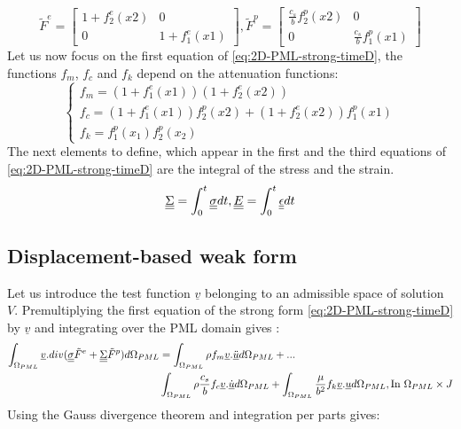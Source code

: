 \begin{equation}
\tilde{F}^e = \begin{bmatrix}
1+f^e_2(x2)&0\\0&1+f^e_1(x1)
\end{bmatrix}, \tilde{F}^p = \begin{bmatrix}
\frac{c_s}{b}f^p_2(x2)&0\\0&\frac{c_s}{b}f^p_1(x1) 
\end{bmatrix} 
\end{equation}
Let us now focus on the first equation of \ref{eq:2D-PML-strong-timeD}, the functions $f_m$, $f_c$ and $f_k$ depend on the attenuation functions:
\begin{equation}
\begin{cases}
f_m = (1+f^e_1(x1))(1+f^e_2(x2))\\
f_c = (1+f^e_1(x1))f^p_2(x2) + (1+f^e_2(x2))f^p_1(x1)\\
f_k = f^p_1(x_1)f^p_2(x_2)
\end{cases}
\end{equation}
The next elements to define, which appear in the first and the third equations of \ref{eq:2D-PML-strong-timeD} are the integral of the stress and the strain.
\begin{equation}
\underline{\underline{\Sigma}} = \int^t_0 \underline{\underline{\sigma}} dt, \underline{\underline{E}} = \int^t_0 \underline{\underline{\epsilon}} dt
\end{equation} 
\subsection{Displacement-based weak form}
Let us introduce the test function $\underline{v}$ belonging to an admissible space of solution $V$. Premultiplying the first equation of the strong form \ref{eq:2D-PML-strong-timeD} by $\underline{v}$ and integrating over the PML domain gives :
\begin{align}
\int_{\Omega_{PML}} \underline{v}.div(\underline{\underline{\sigma}}\tilde{F}^e + \underline{\underline{\Sigma}}\tilde{F}^p) d\Omega_{PML} & = \int_{\Omega_{PML}} \rho f_m \underline{v}.\underline{\ddot{u}} d\Omega_{PML} + ... \nonumber\\
&  \int_{\Omega_{PML}} \rho \frac{c_s}{b} f_c \underline{v}.\underline{\dot{u}} d\Omega_{PML} +  \int_{\Omega_{PML}} \frac{\mu}{b^2}f_k \underline{v}. \underline{u}  d\Omega_{PML},  \text{In } \Omega_{PML} \times J 
\label{eq:weak-form-motion}
\end{align}
Using the Gauss divergence theorem and integration per parts gives:


